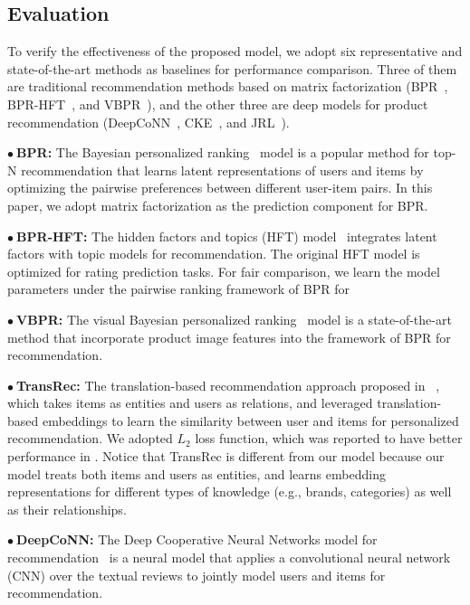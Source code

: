\documentclass[algorithms,article,accept,moreauthors,pdftex,10pt,a4paper]{Definitions/mdpi}
\begin{document}
\subsection{Evaluation}

To verify the effectiveness of the proposed model, we adopt six representative and state-of-the-art methods as baselines for performance comparison. 
Three of them are traditional recommendation methods based on matrix factorization (BPR~\cite{bpr}, BPR-HFT~\cite{mcauley2013hidden}, and VBPR~\cite{he2016vbpr}), and the other three are deep models for product recommendation (DeepCoNN~\cite{zheng2017joint}, CKE~\cite{zhang2016collaborativekdd}, and JRL~\cite{zhang2017joint}). 

\vspace{6 pt} $\bullet~$\textbf{BPR: } The Bayesian personalized ranking~\cite{bpr} model is a popular method for top-N recommendation that learns latent representations of users and items by optimizing the pairwise preferences between different user-item pairs. 
In this paper, we adopt matrix factorization as the prediction component for BPR.

$\bullet~$\textbf{BPR-HFT: } The hidden factors and topics (HFT) model~\cite{mcauley2013hidden} integrates latent factors with topic models for recommendation.
The original HFT model is optimized for rating prediction tasks.
For fair comparison, we learn the model parameters under the pairwise ranking framework of BPR for 

$\bullet~$\textbf{VBPR: } The visual Bayesian personalized ranking~\cite{he2016vbpr} model is a state-of-the-art method that incorporate product image features into the framework of BPR for recommendation.

$\bullet~$\textbf{TransRec: } The translation-based recommendation approach proposed in ~\cite{he2017translation}, which takes items as entities and users as relations, and leveraged translation-based embeddings to learn the similarity between user and items for personalized recommendation. We adopted $L_2$ loss function, which was reported to have better performance in \cite{he2017translation}. 
Notice that TransRec is different from our model because our model treats both items and users as entities, and learns embedding representations for different types of knowledge (e.g., brands, categories) as well as their relationships. 

$\bullet~$\textbf{DeepCoNN: } The Deep Cooperative Neural Networks model for recommendation~\cite{zheng2017joint} is a neural model that applies a convolutional neural network (CNN) over the textual reviews to jointly model users and items for recommendation.
\end{document}
